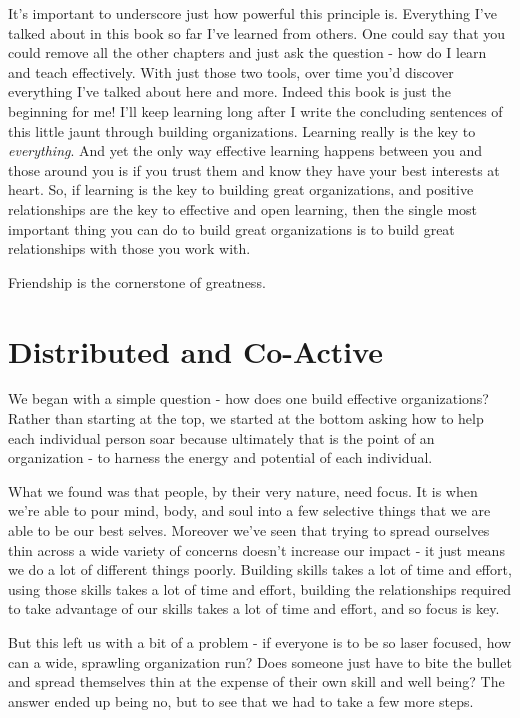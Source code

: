 \documentclass[11pt,a5paper]{book}
\begin{document}
It's important to underscore just how powerful this principle is. Everything I've talked about in this book so far I've learned from others. One could say that you could remove all the other chapters and just ask the question - how do I learn and teach effectively. With just those two tools, over time you'd discover everything I've talked about here and more. Indeed this book is just the beginning for me! I'll keep learning long after I write the concluding sentences of this little jaunt through building organizations. Learning really is the key to \textit{everything}. And yet the only way effective learning happens between you and those around you is if you trust them and know they have your best interests at heart. So, if learning is the key to building great organizations, and positive relationships are the key to effective and open learning, then the single most important thing you can do to build great organizations is to build great relationships with those you work with.
\newline

Friendship is the cornerstone of greatness.

\chapter{Distributed and Co-Active}
We began with a simple question - how does one build effective organizations? Rather than starting at the top, we started at the bottom asking how to help each individual person soar because ultimately that is the point of an organization - to harness the energy and potential of each individual. 
\newline

What we found was that people, by their very nature, need focus. It is when we're able to pour mind, body, and soul into a few selective things that we are able to be our best selves. Moreover we've seen that trying to spread ourselves thin across a wide variety of concerns doesn't increase our impact - it just means we do a lot of different things poorly. Building skills takes a lot of time and effort, using those skills takes a lot of time and effort, building the relationships required to take advantage of our skills takes a lot of time and effort, and so focus is key.
\newline

But this left us with a bit of a problem - if everyone is to be so laser focused, how can a wide, sprawling organization run? Does someone just have to bite the bullet and spread themselves thin at the expense of their own skill and well being? The answer ended up being no, but to see that we had to take a few more steps. 
\newline
\end{document}
